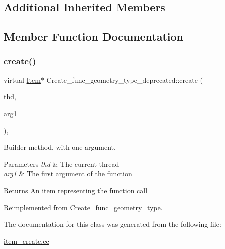 \subsection*{Additional Inherited Members}


\subsection{Member Function Documentation}
\mbox{\label{classCreate__func__geometry__type__deprecated_a737de32ce101c672a4e5dcdccb3685fe}} 
\subsubsection{\texorpdfstring{create()}{create()}}
{\footnotesize\ttfamily virtual \mbox{\hyperlink{classItem}{Item}}$\ast$ Create\+\_\+func\+\_\+geometry\+\_\+type\+\_\+deprecated\+::create (\begin{DoxyParamCaption}\item[{T\+HD $\ast$}]{thd,  }\item[{\mbox{\hyperlink{classItem}{Item}} $\ast$}]{arg1 }\end{DoxyParamCaption})\hspace{0.3cm}{\ttfamily [inline]}, {\ttfamily [virtual]}}

Builder method, with one argument. 
\begin{DoxyParams}{Parameters}
{\em thd} & The current thread \\
\hline
{\em arg1} & The first argument of the function \\
\hline
\end{DoxyParams}
\begin{DoxyReturn}{Returns}
An item representing the function call 
\end{DoxyReturn}


Reimplemented from \mbox{\hyperlink{classCreate__func__geometry__type_ae46eece4f49db39b3919df6fcf83752a}{Create\+\_\+func\+\_\+geometry\+\_\+type}}.



The documentation for this class was generated from the following file\+:\begin{DoxyCompactItemize}
\item 
\mbox{\hyperlink{item__create_8cc}{item\+\_\+create.\+cc}}\end{DoxyCompactItemize}
